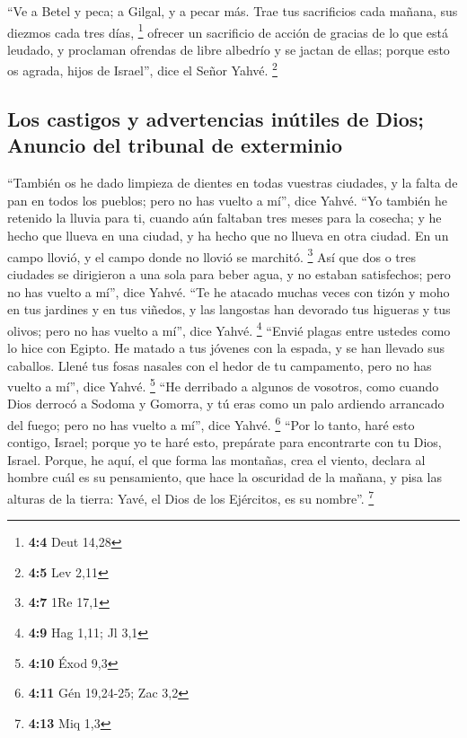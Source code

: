  ``Ve a Betel y peca; a Gilgal, y a pecar más. Trae tus
sacrificios cada mañana, sus diezmos cada tres días, \footnote{\textbf{4:4}
  Deut 14,28}  ofrecer un sacrificio de acción de gracias
de lo que está leudado, y proclaman ofrendas de libre albedrío y se
jactan de ellas; porque esto os agrada, hijos de Israel'', dice el Señor
Yahvé. \footnote{\textbf{4:5} Lev 2,11}

\hypertarget{los-castigos-y-advertencias-inuxfatiles-de-dios-anuncio-del-tribunal-de-exterminio}{%
\subsection{Los castigos y advertencias inútiles de Dios; Anuncio del
tribunal de
exterminio}\label{los-castigos-y-advertencias-inuxfatiles-de-dios-anuncio-del-tribunal-de-exterminio}}

 ``También os he dado limpieza de dientes en todas
vuestras ciudades, y la falta de pan en todos los pueblos; pero no has
vuelto a mí'', dice Yahvé.  ``Yo también he retenido la
lluvia para ti, cuando aún faltaban tres meses para la cosecha; y he
hecho que llueva en una ciudad, y ha hecho que no llueva en otra ciudad.
En un campo llovió, y el campo donde no llovió se marchitó. \footnote{\textbf{4:7}
  1Re 17,1}  Así que dos o tres ciudades se dirigieron a
una sola para beber agua, y no estaban satisfechos; pero no has vuelto a
mí'', dice Yahvé.  ``Te he atacado muchas veces con tizón
y moho en tus jardines y en tus viñedos, y las langostas han devorado
tus higueras y tus olivos; pero no has vuelto a mí'', dice Yahvé.
\footnote{\textbf{4:9} Hag 1,11; Jl 3,1}  ``Envié plagas
entre ustedes como lo hice con Egipto. He matado a tus jóvenes con la
espada, y se han llevado sus caballos. Llené tus fosas nasales con el
hedor de tu campamento, pero no has vuelto a mí'', dice Yahvé.
\footnote{\textbf{4:10} Éxod 9,3}  ``He derribado a
algunos de vosotros, como cuando Dios derrocó a Sodoma y Gomorra, y tú
eras como un palo ardiendo arrancado del fuego; pero no has vuelto a
mí'', dice Yahvé. \footnote{\textbf{4:11} Gén 19,24-25; Zac 3,2}
 ``Por lo tanto, haré esto contigo, Israel; porque yo te
haré esto, prepárate para encontrarte con tu Dios, Israel.
 Porque, he aquí, el que forma las montañas, crea el
viento, declara al hombre cuál es su pensamiento, que hace la oscuridad
de la mañana, y pisa las alturas de la tierra: Yavé, el Dios de los
Ejércitos, es su nombre''. \footnote{\textbf{4:13} Miq 1,3}

